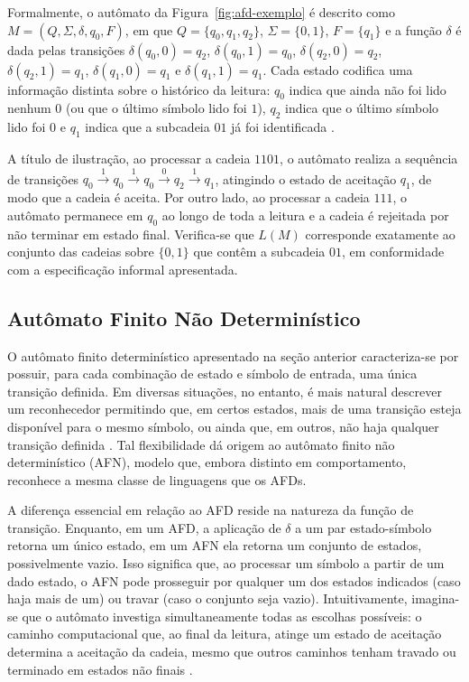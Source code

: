 \documentclass[
    12pt
    ,oneside
    ,a4paper
    ,chapter=TITLE
    ,section=TITLE
    ,sumario=abnt-6027-2012]{abntex2}
\begin{document}
Formalmente, o autômato da Figura~\ref{fig:afd-exemplo} é descrito como
$M = (Q, \Sigma, \delta, q_0, F)$, em que $Q = \{q_0, q_1, q_2\}$, $\Sigma = \{0, 1\}$,
$F = \{q_1\}$ e a função $\delta$ é dada pelas transições $\delta(q_0, 0) = q_2$,
$\delta(q_0, 1) = q_0$, $\delta(q_2, 0) = q_2$, $\delta(q_2, 1) = q_1$, $\delta(q_1, 0) = q_1$ e
$\delta(q_1, 1) = q_1$. Cada estado codifica uma informação distinta sobre o histórico da
leitura: $q_0$ indica que ainda não foi lido nenhum $0$ (ou que o último símbolo lido foi $1$),
$q_2$ indica que o último símbolo lido foi $0$ e $q_1$ indica que a subcadeia $01$ já foi
identificada \cite{hopcroft2006}.

A título de ilustração, ao processar a cadeia $1101$, o autômato realiza a sequência de
transições $q_0 \xrightarrow{1} q_0 \xrightarrow{1} q_0 \xrightarrow{0} q_2 \xrightarrow{1}
q_1$, atingindo o estado de aceitação $q_1$, de modo que a cadeia é aceita. Por outro lado, ao
processar a cadeia $111$, o autômato permanece em $q_0$ ao longo de toda a leitura e a cadeia é
rejeitada por não terminar em estado final. Verifica-se que $L(M)$ corresponde exatamente ao
conjunto das cadeias sobre $\{0, 1\}$ que contêm a subcadeia $01$, em conformidade com a
especificação informal apresentada.

\subsection{Autômato Finito Não Determinístico}
\label{sec:afn}
O autômato finito determinístico apresentado na seção anterior caracteriza-se por possuir, para
cada combinação de estado e símbolo de entrada, uma única transição definida. Em diversas
situações, no entanto, é mais natural descrever um reconhecedor permitindo que, em certos
estados, mais de uma transição esteja disponível para o mesmo símbolo, ou ainda que, em outros,
não haja qualquer transição definida \cite{hopcroft2006,sipser2012}. Tal flexibilidade dá origem
ao autômato finito não determinístico (AFN), modelo que, embora distinto em
comportamento, reconhece a mesma classe de linguagens que os AFDs.

A diferença essencial em relação ao AFD reside na natureza da função de transição. Enquanto, em
um AFD, a aplicação de $\delta$ a um par estado-símbolo retorna um único estado, em um AFN ela
retorna um conjunto de estados, possivelmente vazio. Isso significa que, ao processar
um símbolo a partir de um dado estado, o AFN pode prosseguir por qualquer um dos estados
indicados (caso haja mais de um) ou travar (caso o conjunto seja vazio). Intuitivamente,
imagina-se que o autômato investiga simultaneamente todas as escolhas possíveis: o caminho
computacional que, ao final da leitura, atinge um estado de aceitação determina a aceitação da
cadeia, mesmo que outros caminhos tenham travado ou terminado em estados não finais
\cite{sipser2012}.
\end{document}
